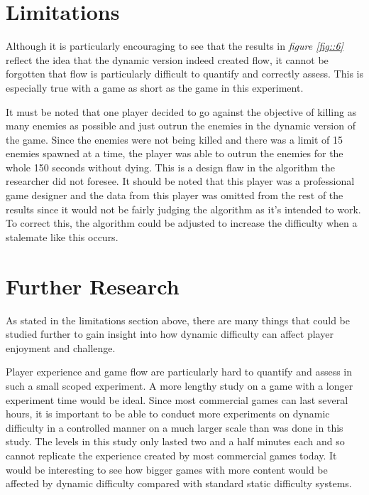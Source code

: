 \documentclass[journal]{IEEEtran}
\begin{document}
\section{Limitations}

Although it is particularly encouraging to see that the results in \textit{figure \ref{fig::6}} reflect the idea that the dynamic version indeed created flow, it cannot be forgotten that flow is particularly difficult to quantify and correctly assess. This is especially true with a game as short as the game in this experiment.

It must be noted that one player decided to go against the objective of killing as many enemies as possible and just outrun the enemies in the dynamic version of the game. Since the enemies were not being killed and there was a limit of 15 enemies spawned at a time, the player was able to outrun the enemies for the whole 150 seconds without dying. This is a design flaw in the algorithm the researcher did not foresee. It should be noted that this player was a professional game designer and the data from this player was omitted from the rest of the results since it would not be fairly judging the algorithm as it's intended to work. To correct this, the algorithm could be adjusted to increase the difficulty when a stalemate like this occurs.

\section{Further Research}
As stated in the limitations section above, there are many things that could be studied further to gain insight into how dynamic difficulty can affect player enjoyment and challenge. 

Player experience and game flow are particularly hard to quantify and assess in such a small scoped experiment. A more lengthy study on a game with a longer experiment time would be ideal. Since most commercial games can last several hours, it is important to be able to conduct more experiments on dynamic difficulty in a controlled manner on a much larger scale than was done in this study. The levels in this study only lasted two and a half minutes each and so cannot replicate the experience created by most commercial games today. It would be interesting to see how bigger games with more content would be affected by dynamic difficulty compared with standard static difficulty systems. 




\end{document}
